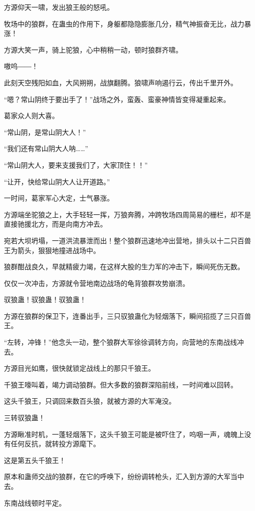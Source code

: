 \begin{this_body}
方源仰天一啸，发出狼王般的怒吼。

牧场中的狼群，在蛊虫的作用下，身躯都隐隐膨胀几分，精气神振奋无比，战力暴涨！

方源大笑一声，骑上驼狼，心中稍稍一动，顿时狼群齐啸。

嗷呜――！

此刻天空残阳如血，大风朔朔，战旗翻腾。狼啸声响遏行云，传出千里开外。

“嗯？常山阴终于要出手了！”战场之外，蛮轰、蛮豪神情皆变得凝重起来。

葛家众人则大喜。

“常山阴，是常山阴大人！”

“我们还有常山阴大人呐……”

“常山阴大人，要来支援我们了，大家顶住！！”

“让开，快给常山阴大人让开道路。”

一时间，葛家军心大定，士气暴涨。

方源端坐驼狼之上，大手轻轻一挥，万狼奔腾，冲跨牧场四周简易的栅栏，却不是直接驰援北方，而是向南方冲去。

宛若大坝坍塌，一道洪流暴泄而出！整个狼群迅速地冲出营地，排头以十二只百兽王为箭头，狠狠地撞进战场中。

狼群酣战良久，早就精疲力竭，在这样大股的生力军的冲击下，瞬间死伤无数。

仅仅一次冲击，方源就令营地南边战场的龟背狼群攻势崩溃。

驭狼蛊！驭狼蛊！驭狼蛊！

方源在狼群的保卫下，连番出手，三只驭狼蛊化为轻烟落下，瞬间招揽了三只百兽王。

“左转，冲锋！”他念头一动，整个狼群大军徐徐调转方向，向营地的东南战线冲去。

方源目光如鹰，很快就锁定战线上的那只千狼王。

千狼王嚎叫着，竭力调动狼群。但大多数的狼群深陷前线，一时间难以回转。

这头千狼王，只调回来数百头狼，就被方源的大军淹没。

三转驭狼蛊！

方源瞅准时机，一蓬轻烟落下，这头千狼王可能是被吓住了，呜咽一声，魂魄上没有任何反抗，就转投方源麾下。

这是第五头千狼王！

原本和蛊师交战的狼群，在它的呼唤下，纷纷调转枪头，汇入到方源的大军当中去。

东南战线顿时平定。

\end{this_body}

